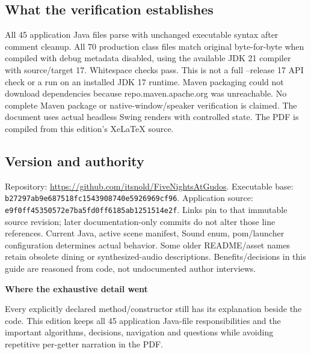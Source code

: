 \documentclass[11pt,a4paper]{article}
\newcommand{\code}[1]{\nolinkurl{#1}}
\newcommand{\note}[2]{\begin{tcolorbox}[enhanced,colback=Pale,colframe=Line,boxrule=0.4pt,arc=1mm,left=7pt,right=7pt,top=5pt,bottom=5pt]\textbf{#1}\par#2\end{tcolorbox}}
\begin{document}
\subsection*{What the verification establishes}
All 45 application Java files parse with unchanged executable syntax after comment cleanup. All 70 production class files match original byte-for-byte when compiled with debug metadata disabled, using the available JDK 21 compiler with source/target 17. Whitespace checks pass. This is not a full --release 17 API check or a run on an installed JDK 17 runtime.
Maven packaging could not download dependencies because repo.maven.apache.org was unreachable. No complete Maven package or native-window/speaker verification is claimed. The document uses actual headless Swing renders with controlled state. The PDF is compiled from this edition's XeLaTeX source.
\subsection*{Version and authority}
Repository: \url{https://github.com/itsnold/FiveNightsAtGudos}. Executable base: \code{b27297ab9e687518fc1543908740e5926969cf96}. Application source: \code{e9f0ff45350572e7ba5fd0ff6185ab1251514e2f}. Links pin to that immutable source revision; later documentation-only commits do not alter those line references.
Current Java, active scene manifest, Sound enum, pom/launcher configuration determines actual behavior. Some older README/asset names retain obsolete dining or synthesized-audio descriptions. Benefits/decisions in this guide are reasoned from code, not undocumented author interviews.
\note{Where the exhaustive detail went}{Every explicitly declared method/constructor still has its explanation beside the code. This edition keeps all 45 application Java-file responsibilities and the important algorithms, decisions, navigation and questions while avoiding repetitive per-getter narration in the PDF.}
\end{document}

